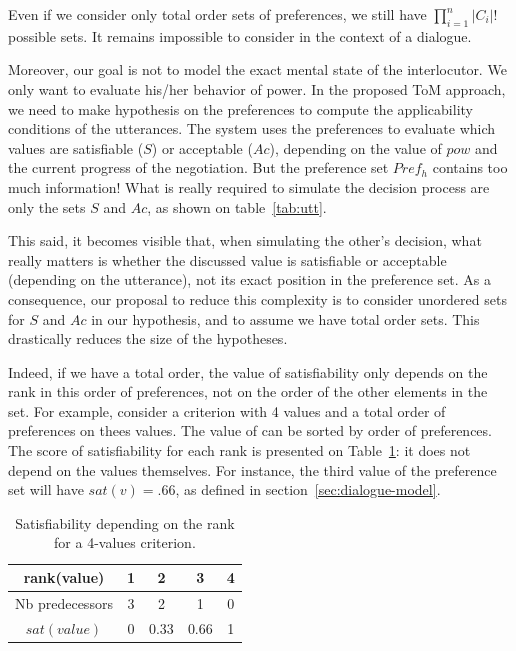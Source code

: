 \documentclass[conference, letterpaper]{IEEEtran}
\begin{document}
	Even if we consider only total order sets of preferences, we still have  $\prod_{i=1}^n |C_i|!$ possible sets. It remains impossible to consider in the context of a dialogue.
	
	Moreover, our goal is not to model the exact mental state of the interlocutor. We only want to evaluate his/her behavior of power. In the proposed ToM approach, we need to make hypothesis on the preferences to compute the applicability conditions of the utterances. The system uses the preferences to evaluate which values are satisfiable ($S$) or acceptable ($Ac$), depending on the value of $pow$ and the current progress of the negotiation. But the preference set $Pref_h$ contains too much information! What is really required to simulate the decision process are only the sets $S$ and $Ac$, as shown on table~\ref{tab:utt}.
	
	This said, it becomes visible that, when simulating the other's decision, what really matters is whether the discussed value is satisfiable or acceptable (depending on the utterance), not its exact position in the preference set. As a consequence, our proposal to reduce this complexity is to consider unordered sets for $S$ and $Ac$ in our hypothesis, and to assume we have total order sets. This drastically reduces the size of the hypotheses.
	
	Indeed, if we have a total order, the value of satisfiability only depends on the rank in this order of preferences, not on the order of the other elements in the set. For example, consider a criterion with 4 values and a total order of preferences on thees values. The value of can be sorted by order of preferences. The score of satisfiability for each rank is presented on Table~\ref{tab:poss}: it does not depend on the values themselves. For instance, the third value of the preference set will have $sat(v)=.66$, as defined in section~\ref{sec:dialogue-model}.
	\begin{table}[h]
		\caption{Satisfiability depending on the rank for a 4-values criterion.}
		\label{tab:poss}
		\centering
		\begin{tabular}{ |c|c|c|c|c| }
			\hline				
			rank(value) & 1 & 2 & 3 & 4 \\
			\hline
			Nb predecessors & 3 & 2 & 1& 0 \\
			\hline
			$sat(value)$ & 0 & 0.33 & 0.66 &1 \\
			\hline
		\end{tabular}
	\end{table}
	
\end{document}
